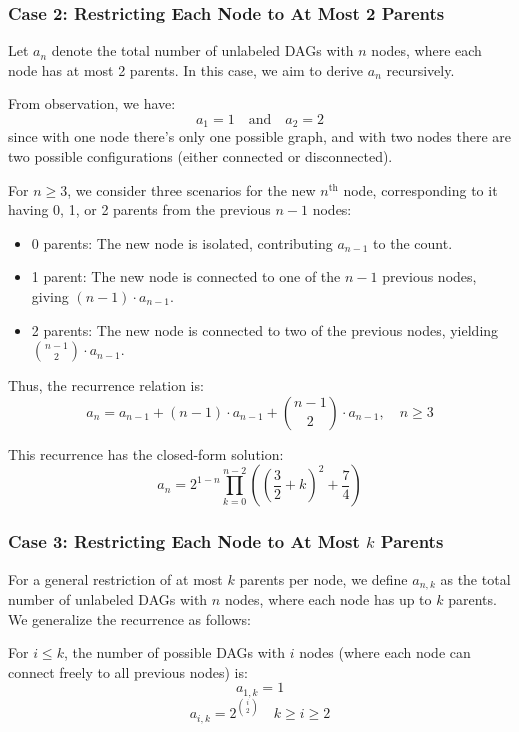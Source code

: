 \documentclass{article}
\begin{document}
\subsubsection*{Case 2: Restricting Each Node to At Most 2 Parents}

Let \( a_n \) denote the total number of unlabeled DAGs with \( n \) nodes, where each node has at most 2 parents. In this case, we aim to derive \( a_n \) recursively.

From observation, we have:
\[
a_1 = 1 \quad \text{and} \quad a_2 = 2
\]
since with one node there’s only one possible graph, and with two nodes there are two possible configurations (either connected or disconnected).


For \( n \geq 3 \), we consider three scenarios for the new \( n^{\text{th}} \) node, corresponding to it having 0, 1, or 2 parents from the previous \( n-1 \) nodes:
\begin{itemize}
    \item 0 parents: The new node is isolated, contributing \( a_{n-1} \) to the count.
    \item 1 parent: The new node is connected to one of the \( n-1 \) previous nodes, giving \( (n-1) \cdot a_{n-1} \).
    \item 2 parents: The new node is connected to two of the previous nodes, yielding \( \binom{n-1}{2} \cdot a_{n-1} \).
\end{itemize}

Thus, the recurrence relation is:
\[
a_n = a_{n-1} + (n-1) \cdot a_{n-1} + \binom{n-1}{2} \cdot a_{n-1}, \quad n \geq 3
\]

This recurrence has the closed-form solution:
\[
a_n = 2^{1 - n} \prod_{k=0}^{n-2} \left(\left(\frac{3}{2} + k\right)^2 + \frac{7}{4}\right)
\]

\subsubsection*{Case 3: Restricting Each Node to At Most \( k \) Parents}

For a general restriction of at most \( k \) parents per node, we define \( a_{n,k} \) as the total number of unlabeled DAGs with \( n \) nodes, where each node has up to \( k \) parents. We generalize the recurrence as follows:


For \( i \leq k \), the number of possible DAGs with \( i \) nodes (where each node can connect freely to all previous nodes) is:
\[
a_{1,k} = 1
\]
\[
a_{i,k} = 2^{\binom{i}{2}} \quad   k \geq i \geq 2
\]
\end{document}
